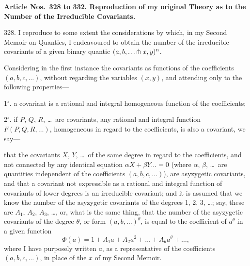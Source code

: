 \documentclass[11pt,a4paper]{article}
\begin{document}
\newpage
\setcounter{page}{336}

\textbf{Article Nos.\ 328 to 332. Reproduction of my original Theory as to the Number of the Irreducible Covariants.}

328. I reproduce to some extent the considerations by which, in my Second Memoir on Quantics, I endeavoured to obtain the number of the irreducible covariants of a given binary quantic $(a, b, \ldots \hspace{-0.2em}\pitchfork x, y)^{n}$.

Considering in the first instance the covariants as functions of the coefficients $(a, b, c, \ldots)$, without regarding the variables $(x, y)$, and attending only to the following properties---

1$^{\circ}$. a covariant is a rational and integral homogeneous function of the coefficients;

2$^{\circ}$. if $P$, $Q$, $R$, \ldots\ are covariants, any rational and integral function $F(P, Q, R, \ldots)$, homogeneous in regard to the coefficients, is also a covariant, we say---

that the covariants $X$, $Y$, \ldots\ of the same degree in regard to the coefficients, and not connected by any identical equation $\alpha X + \beta Y \ldots = 0$ (where $\alpha$, $\beta$, \ldots\ are quantities independent of the coefficients $(a, b, c, \ldots)$), are asyzygetic covariants, and that a covariant not expressible as a rational and integral function of covariants of lower degrees is an irreducible covariant; and it is assumed that we know the number of the asyzygetic covariants of the degrees 1, 2, 3, \ldots; say, these are $A_{1}$, $A_{2}$, $A_{3}$, \ldots, or, what is the same thing, that the number of the asyzygetic covariants of the degree $\theta$, or form $(a, b, \ldots)^{\theta}$, is equal to the coefficient of $a^{\theta}$ in a given function
\[
\Phi(a) = 1 + A_{1}a + A_{2}a^{2} + \ldots + A_{\theta}a^{\theta} + \ldots,
\]
where I have purposely written $a$, as a representative of the coefficients $(a, b, c, \ldots)$, in place of the $x$ of my Second Memoir.
\end{document}
